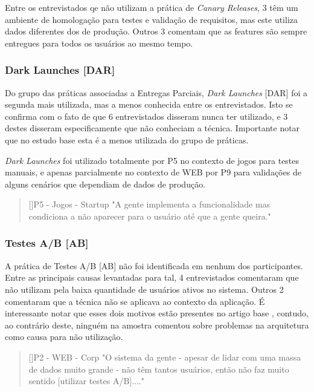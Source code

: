 Entre os entrevistados qe não utilizam a prática de \emph{Canary Releases}, 3 têm um ambiente de homologação para testes e validação de requisitos, mas este utiliza dados diferentes dos de produção. Outros 3 comentam que as features são sempre entregues para todos os usuários ao mesmo tempo.


\subsubsection{Dark Launches [DAR]}

Do grupo das práticas associadas a Entregas Parciais, \emph{Dark Launches} [DAR] foi a segunda mais utilizada, mas a menos conhecida entre os entrevistados. Isto se confirma com o fato de que 6 entrevistados disseram nunca ter utilizado, e 3 destes disseram especificamente que não conheciam a técnica. Importante notar que no estudo base \cite{empiricalStudy2016} esta é a menos utilizada do grupo de práticas.

\emph{Dark Launches} foi utilizado totalmente por P5 no contexto de jogos para testes manuais, e apenas parcialmente no contexto de WEB por P9 para validações de alguns cenários que dependiam de dados de produção.


\begin{quotation}[]{P5 - Jogos - Startup}
    "A gente implementa a funcionalidade mas condiciona a não aparecer para o usuário até que a gente queira."
\end{quotation}

\subsubsection{Testes A/B [AB]}

A prática de Testes A/B [AB] não foi identificada em nenhum dos participantes. Entre as principais causas levantadas para tal, 4 entrevistados comentaram que não utilizam pela baixa quantidade de usuários ativos no sistema. Outros 2 comentaram que a técnica não se aplicava ao contexto da aplicação. É interessante notar que esses dois motivos estão presentes no artigo base \cite{empiricalStudy2016}, contudo, ao contrário deste, ninguém na amostra comentou sobre problemas na arquitetura como causa para não utilização.


\begin{quotation}[]{P2 - WEB - Corp}
    "O sistema da gente - apesar de lidar com uma massa de dados muito grande - não têm tantos usuários, então não faz muito sentido [utilizar testes A/B]...."
\end{quotation}

